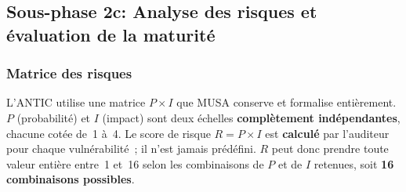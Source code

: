 \documentclass[12pt,a4paper,oneside]{report}
\begin{document}
\subsection{Sous-phase 2c: Analyse des risques et \'evaluation de la maturit\'e}

\subsubsection{Matrice des risques}

L'ANTIC utilise une matrice $P \times I$ que MUSA conserve et formalise
enti\`erement. $P$ (probabilit\'e) et $I$ (impact) sont deux \'echelles
\textbf{compl\`etement ind\'ependantes}, chacune cot\'ee de~1 \`a~4.
Le score de risque $R = P \times I$ est \textbf{calcul\'e} par l'auditeur
pour chaque vuln\'erabilit\'e~; il n'est jamais pr\'ed\'efini. $R$
peut donc prendre toute valeur enti\`ere entre~1 et~16 selon les
combinaisons de $P$ et de $I$ retenues, soit \textbf{16 combinaisons
	possibles}.
\end{document}
